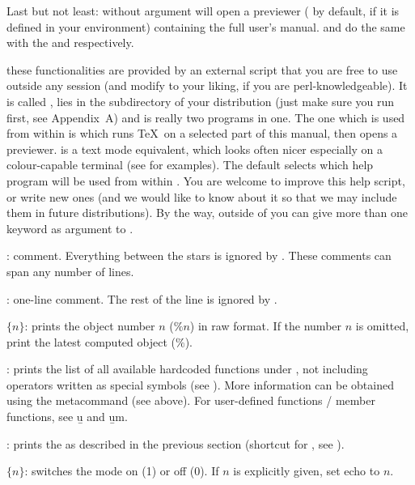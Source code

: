 Last but not least:  without argument will open a 
previewer ( by default,  if it is defined in your
environment) containing the full user's manual.  and
 do the same with the  and 
respectively.

 these functionalities are provided by an
external  script that you are free to use outside any  session
(and modify to your liking, if you are perl-knowledgeable). It is called
, lies in the  subdirectory of your distribution
(just make sure you run  first, see Appendix~A) and is
really two programs in one. The one which is used from within  is
 which runs \TeX\ on a selected part of this manual, then opens
a previewer.  is a text mode equivalent, which looks
often nicer especially on a colour-capable terminal (see
 for examples). The default  selects which
help program will be used from within . You are welcome to improve this
help script, or write new ones (and we would like to know about it
so that we may include them in future distributions). By the way, outside
of  you can give more than one keyword as argument to .

: comment. Everything between the stars is ignored by
. These comments can span any number of lines.

\subseckbd{\bs\bs}: one-line comment. The rest of the line
is ignored by .

 $\{n\}$: prints the object number $n$ ($\%n$)
in raw format. If the number $n$ is omitted, print the latest computed object
($\%$). \label{se:history}

: prints the list of all available
hardcoded functions under , not including operators written as special
symbols (see ). More information can be obtained using
the  metacommand (see above). For user-defined functions / member
functions, see \b{u} and \b{um}.

: prints the  as described in the
previous section (shortcut for , see ).

 $\{n\}$: switches the  mode on (1) or off (0). If
$n$ is explicitly given, set echo to $n$.

